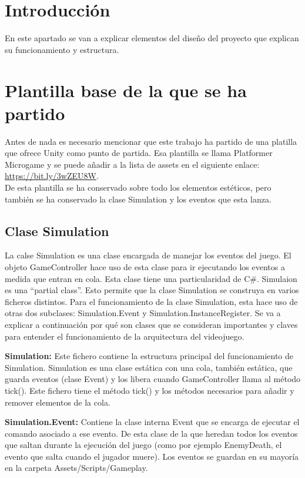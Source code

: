 
\section{Introducción}
En este apartado se van a explicar elementos del diseño del proyecto que explican su funcionamiento y estructura.

\section{Plantilla base de la que se ha partido}
Antes de nada es necesario mencionar que este trabajo ha partido de una platilla que ofrece Unity como punto de partida. Esa plantilla se llama Platformer Microgame y se puede añadir a la lista de assets en el siguiente enlace:\\
 \url{https://bit.ly/3wZEU8W}.\\ 
De esta plantilla se ha conservado sobre todo los elementos estéticos, pero también se ha conservado la clase Simulation y los eventos que esta lanza.

\subsection{Clase Simulation}
La calse Simulation es una clase encargada de manejar los eventos del juego. El objeto GameController hace uso de esta clase para ir ejecutando los eventos a medida que entran en cola. Esta clase tiene una particularidad de C\#. Simulaion es una “partial class”. Esto permite que la clase Simulation se construya en varios ficheros distintos. Para el funcionamiento de la clase Simulation, esta hace uso de otras dos subclases: Simulation.Event y Simulation.InstanceRegister. Se va a explicar a continuación por qué son clases que se consideran importantes y claves para entender el funcionamiento de la arquitectura del videojuego.

\textbf{Simulation:} Este fichero contiene la estructura principal del funcionamiento de Simulation. Simulation es una clase estática con una cola, también estática, que guarda eventos (clase Event) y los libera cuando GameController llama al método tick(). Este fichero tiene el método tick() y los métodos necesarios para añadir y remover elementos de la cola. 

\textbf{Simulation.Event:} Contiene la clase interna Event que se encarga de ejecutar el comando asociado a ese evento. De esta clase de la que heredan todos los eventos que saltan durante la ejecución del juego (como por ejemplo EnemyDeath, el evento que salta cuando el jugador muere). Los eventos se guardan en su mayoría en la carpeta Assets/Scripts/Gameplay.

